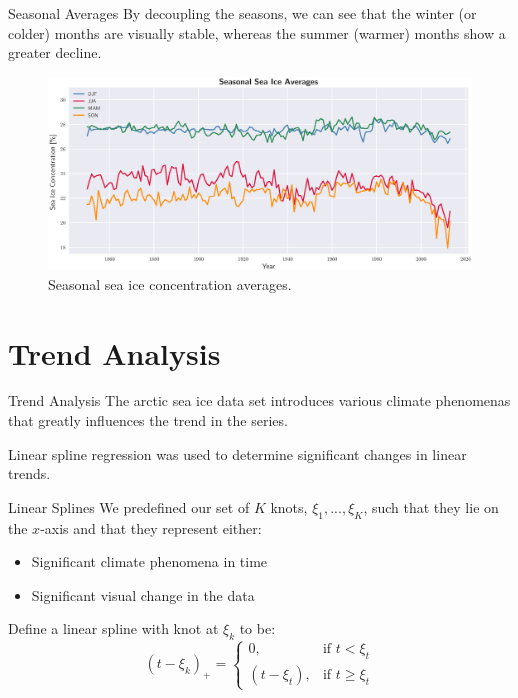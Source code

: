 \documentclass[10pt]{beamer}
\begin{document}
\begin{frame}{Seasonal Averages}
By decoupling the seasons, we can see that the winter (or colder) months are visually stable, whereas the summer (warmer) months show a greater decline.

	\begin{figure}[htbp]
		\centering
		\includegraphics[scale=0.37]{seasonal_avgs}
		\caption{Seasonal sea ice concentration averages.}
	\end{figure}
\end{frame}

\section{Trend Analysis}
\begin{frame}{Trend Analysis}
The arctic sea ice data set introduces various climate phenomenas that greatly influences
the trend in the series.

Linear spline regression was used to determine significant changes in linear trends.
\end{frame}

\begin{frame}{Linear Splines}
We predefined our set of $K$ knots, $\xi_{1},...,\xi_{K}$, such that they lie on the $x$-axis and that they represent either:
\begin{itemize}
	\item Significant climate phenomena in time
	\item Significant visual change in the data
\end{itemize}

Define a linear spline with knot at $\xi_{k}$ to be:
$$(t-\xi_{k})_{+} = 
\begin{cases}
0, & \text{if $t < \xi_{t}$} \\
(t-\xi_{t}), & \text{if $t \geq \xi_{t}$}
\end{cases}$$

\begin{center}
\end{center}
\end{frame}
\end{document}
